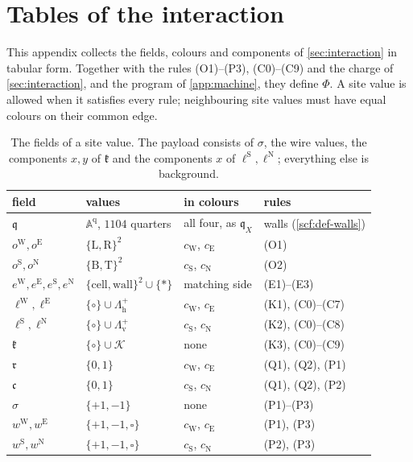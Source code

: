 \section{Tables of the interaction}\label{app:tables}

This appendix collects the fields, colours and components of \cref{sec:interaction} in tabular form. Together with the rules (O1)--(P3), (C0)--(C9) and the charge of \cref{sec:interaction}, and the program of \cref{app:machine}, they define $\Phi$. A site value is allowed when it satisfies every rule; neighbouring site values must have equal colours on their common edge.

\begin{table}[ht]
\centering
\small
\begin{tabularx}{\textwidth}{@{}l>{\raggedright\arraybackslash}X>{\raggedright\arraybackslash}p{2.9cm}>{\raggedright\arraybackslash}p{2.6cm}@{}}
\toprule
field & values & in colours & rules\\
\midrule
$\mathfrak q$ & $\mathbb A^{\mathrm q}$, $1104$ quarters & all four, as $\mathfrak q_X$ & walls (\cref{scf:def-walls})\\
$o^{\mathrm W},o^{\mathrm E}$ & $\{\mathrm L,\mathrm R\}^2$ & $c_{\mathrm W}$, $c_{\mathrm E}$ & (O1)\\
$o^{\mathrm S},o^{\mathrm N}$ & $\{\mathrm B,\mathrm T\}^2$ & $c_{\mathrm S}$, $c_{\mathrm N}$ & (O2)\\
$e^{\mathrm W},e^{\mathrm E},e^{\mathrm S},e^{\mathrm N}$ & $\{\mathrm{cell},\mathrm{wall}\}^2\cup\{*\}$ & matching side & (E1)--(E3)\\
$\ell^{\mathrm W},\ell^{\mathrm E}$ & $\{\circ\}\cup\Lambda^+_{\mathrm h}$ & $c_{\mathrm W}$, $c_{\mathrm E}$ & (K1), (C0)--(C7)\\
$\ell^{\mathrm S},\ell^{\mathrm N}$ & $\{\circ\}\cup\Lambda^+_{\mathrm v}$ & $c_{\mathrm S}$, $c_{\mathrm N}$ & (K2), (C0)--(C8)\\
$\mathfrak k$ & $\{\circ\}\cup\mathcal K$ & none & (K3), (C0)--(C9)\\
$\mathfrak r$ & $\{0,1\}$ & $c_{\mathrm W}$, $c_{\mathrm E}$ & (Q1), (Q2), (P1)\\
$\mathfrak c$ & $\{0,1\}$ & $c_{\mathrm S}$, $c_{\mathrm N}$ & (Q1), (Q2), (P2)\\
$\sigma$ & $\{+1,-1\}$ & none & (P1)--(P3)\\
$w^{\mathrm W},w^{\mathrm E}$ & $\{+1,-1,\square\}$ & $c_{\mathrm W}$, $c_{\mathrm E}$ & (P1), (P3)\\
$w^{\mathrm S},w^{\mathrm N}$ & $\{+1,-1,\square\}$ & $c_{\mathrm S}$, $c_{\mathrm N}$ & (P2), (P3)\\
\bottomrule
\end{tabularx}
\caption{The fields of a site value. The payload consists of $\sigma$, the wire values, the components $x,y$ of $\mathfrak k$ and the components $x$ of $\ell^{\mathrm S},\ell^{\mathrm N}$; everything else is background.}
\label{tab:fields}
\end{table}

